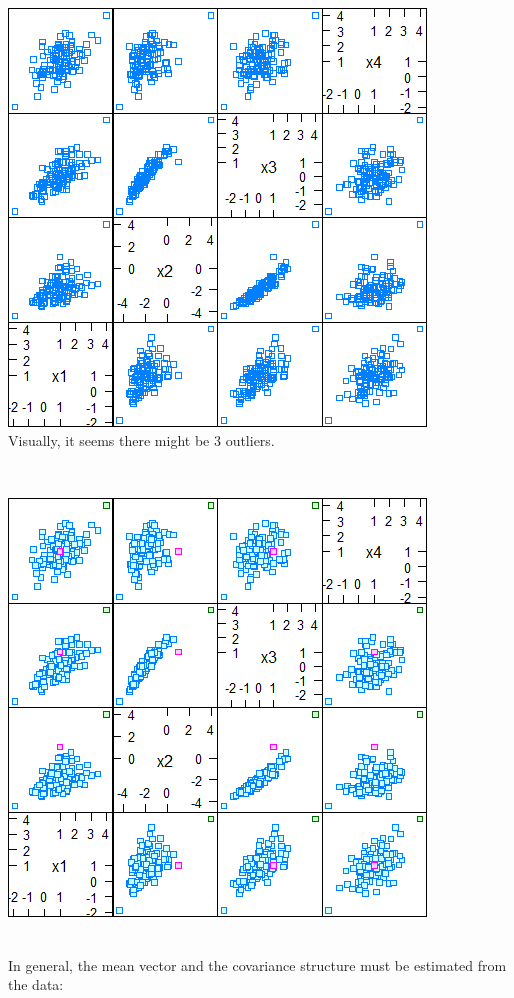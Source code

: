 \documentclass[20pt,landscape,footrule,headrule]{foils}
\begin{document}
\newpage\ \begin{center}
\includegraphics[height=0.8\textheight]{Images/Artificial_4D_Dataset} \\ Visually, it seems there might be $3$ outliers. 
\end{center} \newpage\ \begin{center}
\includegraphics[height=0.92\textheight]{Images/Artificial_4D_Dataset_Groups}
\end{center}\newpage\ \\ \noindent In general, the mean vector and the covariance structure must be estimated from the data: 
\end{document}

